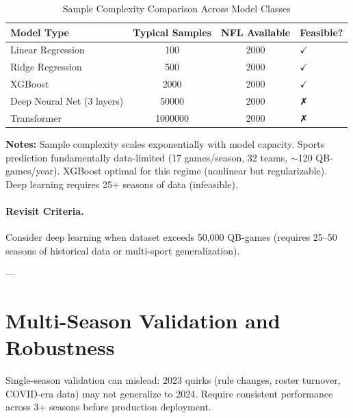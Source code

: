 \begin{table}[htbp]
\centering
\small
\caption{Sample Complexity Comparison Across Model Classes}
\label{tab:sample-complexity}
\begin{tabular}{@{}lS[table-format=6.0]S[table-format=4.0]l@{}}
\toprule
\textbf{Model Type} & {\textbf{Typical Samples}} & {\textbf{NFL Available}} & \textbf{Feasible?} \\
\midrule
Linear Regression & 100 & 2000 & $\checkmark$ \\
Ridge Regression & 500 & 2000 & $\checkmark$ \\
XGBoost & 2000 & 2000 & $\checkmark$ \\
Deep Neural Net (3 layers) & 50000 & 2000 & ✗ \\
Transformer & 1000000 & 2000 & ✗ \\
\bottomrule
\end{tabular}
\begin{tablenotes}
\item \textbf{Notes:} Sample complexity scales exponentially with model capacity. Sports prediction fundamentally data-limited (17 games/season, 32 teams, $\sim$120 QB-games/year). XGBoost optimal for this regime (nonlinear but regularizable). Deep learning requires 25+ seasons of data (infeasible).
\end{tablenotes}
\end{table}

\paragraph{Revisit Criteria.}
Consider deep learning when dataset exceeds 50,000 QB-games (requires 25--50 seasons of historical data or multi-sport generalization).

---

\section{Multi-Season Validation and Robustness}
\label{sec:multiseas-validation}

Single-season validation can mislead: 2023 quirks (rule changes, roster turnover, COVID-era data) may not generalize to 2024. Require consistent performance across 3+ seasons before production deployment.

